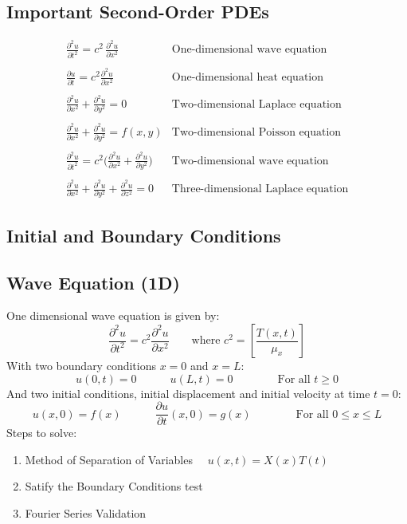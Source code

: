 \subsection{Important Second-Order PDEs}

$$\begin{array}{ll}
  \displaystyle \frac{\partial^{2}u}{\partial t^{2}}=c^{2}\,\frac{\partial^{2}u}{\partial x^{2}}&\text{One-dimensional wave equation}\\ \\
  \displaystyle{\frac{\partial u}{\partial t}}=c^{2}{\frac{\partial^{2}u}{\partial x^{2}}}&\text{One-dimensional heat equation}\\ \\
 \displaystyle {\frac{\partial^{2}u}{\partial x^{2}}}+{\frac{\partial^{2}u}{\partial y^{2}}}=0&\text{Two-dimensional Laplace equation}\\ \\
 \displaystyle {\frac{\partial^{2}u}{\partial x^{2}}}+{\frac{\partial^{2}u}{\partial y^{2}}}=f(x,y)&\text{Two-dimensional Poisson equation}\\ \\
 \displaystyle \frac{\partial^{2}u}{\partial t^{2}}=c^{2}\biggl(\frac{\partial^{2}u}{\partial x^{2}}+\frac{\partial^{2}u}{\partial y^{2}}\biggr)&\text{Two-dimensional wave equation}\\ \\
 \displaystyle {\frac{\partial^{2}u}{\partial x^{2}}}+{\frac{\partial^{2}u}{\partial y^{2}}}+{\frac{\partial^{2}u}{\partial z^{2}}}=0&\text{Three-dimensional Laplace equation}
\end{array}$$
\subsection{Initial and Boundary Conditions}

\subsection{Wave Equation (1D)}
One dimensional wave equation is given by:
\begin{equation}
  \frac{\partial^2 u}{\partial t^2} = c^2 \frac{\partial^2 u}{\partial x^2}\quad\quad\text{where }c^2=\left[\frac{T(x,t)}{\mu_x}\right]
  \label{eq:wave1d}
\end{equation}
With two boundary conditions $x=0$ and $x=L$:
$$u(0,t)=0\qquad\quad u(L,t)=0\qquad\qquad \text{For all }t\geq 0$$
And two initial conditions, initial displacement and initial velocity at time $t=0$:
$$u(x,0)=f(x)\qquad\quad \frac{\partial u}{\partial t}(x,0)=g(x)\qquad\qquad \text{For all }0\leq x\leq L$$
Steps to solve:
\begin{enumerate}
  \item Method of Separation of Variables $\quad u(x,t)=X(x)T(t)$
  \item Satify the Boundary Conditions test
  \item Fourier Series Validation

\end{enumerate}
